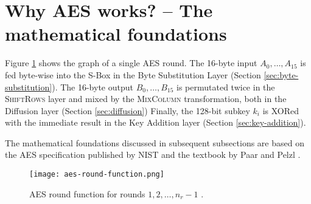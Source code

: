 \section{Why AES works? -- The mathematical foundations}
\label{sec:why}
\label{sec:math}

Figure \ref{fig:aes-round-function} shows the graph of a single AES round. 
The 16-byte input $A_0, \dots, A_{15}$ is fed byte-wise into the S-Box in the Byte Substitution Layer (Section \ref{sec:byte-substitution}).
The 16-byte output $B_0, \dots, B_{15}$ is permutated twice in the \textsc{ShiftRows} layer and mixed by the \textsc{MixColumn} transformation, both in the Diffusion layer (Section \ref{sec:diffusion})
Finally, the 128-bit subkey $k_i$ is XORed with the immediate result in the Key Addition layer (Section \ref{sec:key-addition}).

The mathematical foundations discussed in subsequent subsections are based on the \gls{AES} specification published by \gls{NIST} \cite{NIST_AES} and the textbook by Paar and Pelzl \cite{Paar2024}.

\begin{figure}[!ht]
    \centering
    \texttt{[image: aes-round-function.png]}
    \caption{
        AES round function for rounds $1, 2, \dots, n_r-1$ \cite{Paar2024}.
    }
    \label{fig:aes-round-function}
\end{figure}










